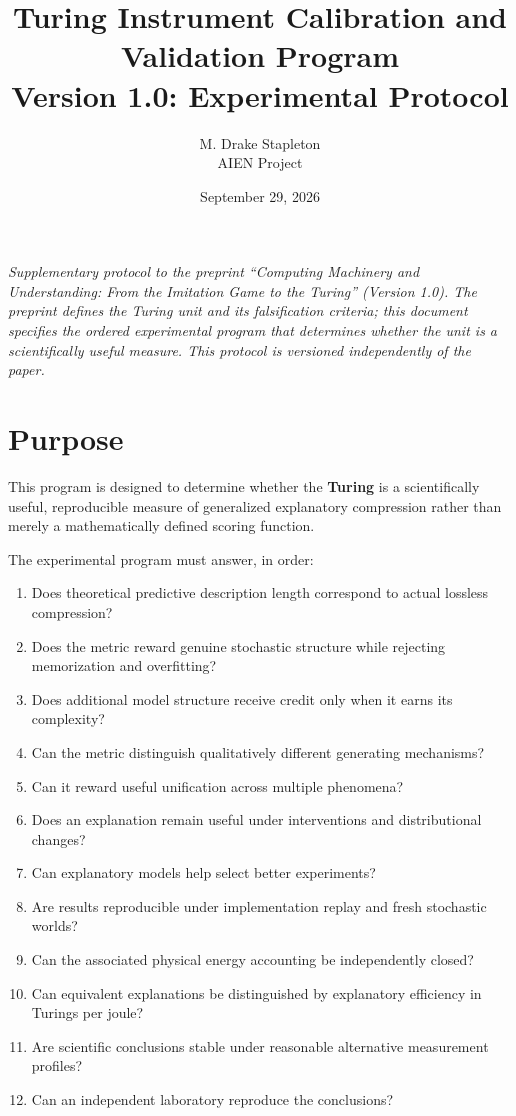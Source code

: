 \documentclass[11pt]{article}
\title{Turing Instrument Calibration and Validation Program\\
Version 1.0: Experimental Protocol}
\author{M. Drake Stapleton\\AIEN Project}
\date{September 29, 2026}
\begin{document}
\maketitle

\noindent\textit{Supplementary protocol to the preprint ``Computing Machinery and Understanding: From the Imitation Game to the Turing'' (Version 1.0). The preprint defines the Turing unit and its falsification criteria; this document specifies the ordered experimental program that determines whether the unit is a scientifically useful measure. This protocol is versioned independently of the paper.}

\section{Purpose}

This program is designed to determine whether the \textbf{Turing} is a scientifically useful, reproducible measure of generalized explanatory compression rather than merely a mathematically defined scoring function.

The experimental program must answer, in order:

\begin{enumerate}
\item Does theoretical predictive description length correspond to actual lossless compression?
\item Does the metric reward genuine stochastic structure while rejecting memorization and overfitting?
\item Does additional model structure receive credit only when it earns its complexity?
\item Can the metric distinguish qualitatively different generating mechanisms?
\item Can it reward useful unification across multiple phenomena?
\item Does an explanation remain useful under interventions and distributional changes?
\item Can explanatory models help select better experiments?
\item Are results reproducible under implementation replay and fresh stochastic worlds?
\item Can the associated physical energy accounting be independently closed?
\item Can equivalent explanations be distinguished by explanatory efficiency in Turings per joule?
\item Are scientific conclusions stable under reasonable alternative measurement profiles?
\item Can an independent laboratory reproduce the conclusions?
\end{enumerate}
\end{document}
